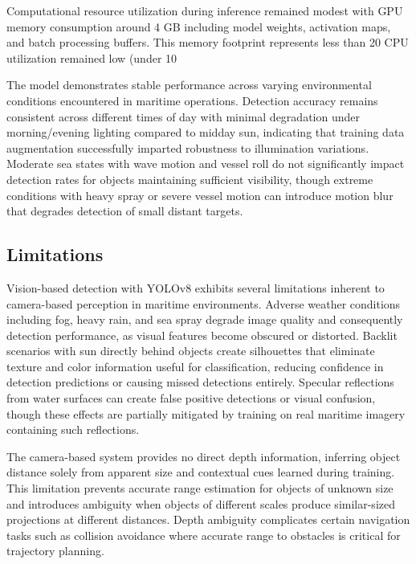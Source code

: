 \documentclass{erauthesis}
\begin{document}
Computational resource utilization during inference remained modest with GPU memory consumption around 4 GB including model weights, activation maps, and batch processing buffers.
This memory footprint represents less than 20%
CPU utilization remained low (under 10%

The model demonstrates stable performance across varying environmental conditions encountered in maritime operations.
Detection accuracy remains consistent across different times of day with minimal degradation under morning/evening lighting compared to midday sun, indicating that training data augmentation successfully imparted robustness to illumination variations.
Moderate sea states with wave motion and vessel roll do not significantly impact detection rates for objects maintaining sufficient visibility, though extreme conditions with heavy spray or severe vessel motion can introduce motion blur that degrades detection of small distant targets.

\subsection{Limitations} \label{sec:yolo_limitations}

Vision-based detection with YOLOv8 exhibits several limitations inherent to camera-based perception in maritime environments.
Adverse weather conditions including fog, heavy rain, and sea spray degrade image quality and consequently detection performance, as visual features become obscured or distorted.
Backlit scenarios with sun directly behind objects create silhouettes that eliminate texture and color information useful for classification, reducing confidence in detection predictions or causing missed detections entirely.
Specular reflections from water surfaces can create false positive detections or visual confusion, though these effects are partially mitigated by training on real maritime imagery containing such reflections.

The camera-based system provides no direct depth information, inferring object distance solely from apparent size and contextual cues learned during training.
This limitation prevents accurate range estimation for objects of unknown size and introduces ambiguity when objects of different scales produce similar-sized projections at different distances.
Depth ambiguity complicates certain navigation tasks such as collision avoidance where accurate range to obstacles is critical for trajectory planning.
\end{document}
